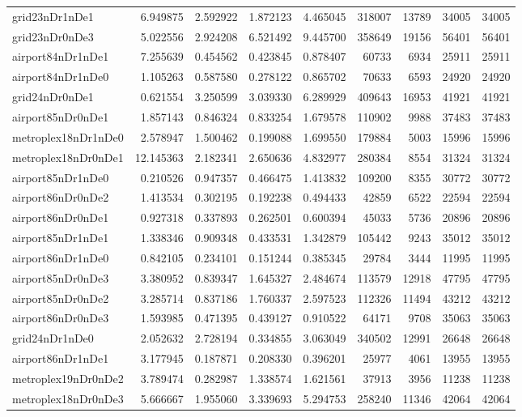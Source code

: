 \begin{longtable}{|l|r|r|r|r|r|r|r|r|}
grid23nDr1nDe1 & 6.949875 & 2.592922 & 1.872123 & 4.465045 & 318007 & 13789 & 34005 & 34005 \\
grid23nDr0nDe3 & 5.022556 & 2.924208 & 6.521492 & 9.445700 & 358649 & 19156 & 56401 & 56401 \\
airport84nDr1nDe1 & 7.255639 & 0.454562 & 0.423845 & 0.878407 & 60733 & 6934 & 25911 & 25911 \\
airport84nDr1nDe0 & 1.105263 & 0.587580 & 0.278122 & 0.865702 & 70633 & 6593 & 24920 & 24920 \\
grid24nDr0nDe1 & 0.621554 & 3.250599 & 3.039330 & 6.289929 & 409643 & 16953 & 41921 & 41921 \\
airport85nDr0nDe1 & 1.857143 & 0.846324 & 0.833254 & 1.679578 & 110902 & 9988 & 37483 & 37483 \\
metroplex18nDr1nDe0 & 2.578947 & 1.500462 & 0.199088 & 1.699550 & 179884 & 5003 & 15996 & 15996 \\
metroplex18nDr0nDe1 & 12.145363 & 2.182341 & 2.650636 & 4.832977 & 280384 & 8554 & 31324 & 31324 \\
airport85nDr1nDe0 & 0.210526 & 0.947357 & 0.466475 & 1.413832 & 109200 & 8355 & 30772 & 30772 \\
airport86nDr0nDe2 & 1.413534 & 0.302195 & 0.192238 & 0.494433 & 42859 & 6522 & 22594 & 22594 \\
airport86nDr0nDe1 & 0.927318 & 0.337893 & 0.262501 & 0.600394 & 45033 & 5736 & 20896 & 20896 \\
airport85nDr1nDe1 & 1.338346 & 0.909348 & 0.433531 & 1.342879 & 105442 & 9243 & 35012 & 35012 \\
airport86nDr1nDe0 & 0.842105 & 0.234101 & 0.151244 & 0.385345 & 29784 & 3444 & 11995 & 11995 \\
airport85nDr0nDe3 & 3.380952 & 0.839347 & 1.645327 & 2.484674 & 113579 & 12918 & 47795 & 47795 \\
airport85nDr0nDe2 & 3.285714 & 0.837186 & 1.760337 & 2.597523 & 112326 & 11494 & 43212 & 43212 \\
airport86nDr0nDe3 & 1.593985 & 0.471395 & 0.439127 & 0.910522 & 64171 & 9708 & 35063 & 35063 \\
grid24nDr1nDe0 & 2.052632 & 2.728194 & 0.334855 & 3.063049 & 340502 & 12991 & 26648 & 26648 \\
airport86nDr1nDe1 & 3.177945 & 0.187871 & 0.208330 & 0.396201 & 25977 & 4061 & 13955 & 13955 \\
metroplex19nDr0nDe2 & 3.789474 & 0.282987 & 1.338574 & 1.621561 & 37913 & 3956 & 11238 & 11238 \\
metroplex18nDr0nDe3 & 5.666667 & 1.955060 & 3.339693 & 5.294753 & 258240 & 11346 & 42064 & 42064 \\

\end{longtable}
